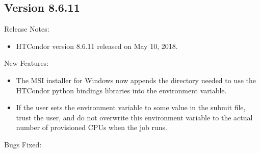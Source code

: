 \subsection*{\label{sec:New-8-6-11}Version 8.6.11}

\noindent Release Notes:

\begin{itemize}

\item HTCondor version 8.6.11 released on May 10, 2018.

\end{itemize}


\noindent New Features:

\begin{itemize}

\item The MSI installer for Windows now appends the directory needed to use the
HTCondor python bindings libraries into the  environment variable.

\item If the user sets the environment variable  to some value
in the submit file, trust the user, and do not overwrite this environment
variable to the actual number of provisioned CPUs when the job runs.

\end{itemize}

\noindent Bugs Fixed:

